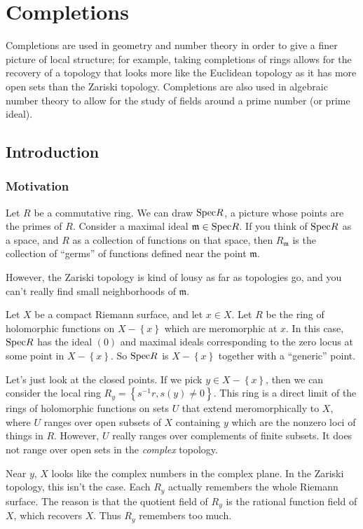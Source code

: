 \chapter{Completions}

Completions are used in geometry and number theory in order to give a finer
picture of local structure; for example, taking completions of rings allows for
the recovery of a topology that looks more like the Euclidean topology as it
has more open sets than the Zariski topology. Completions are also used in
algebraic number theory to allow for the study of fields around a prime number
(or prime ideal).

\section{Introduction}

\subsection{Motivation}
Let $R$ be a commutative ring. We can draw $\mathrm{Spec} R$, a picture whose
points are the primes of $R$. Consider a maximal ideal $\mathfrak{m} \in \mathrm{Spec}
R$. If you think of $\mathrm{Spec} R$ as a space, and $R$ as a collection of functions
on that space, then $R_{\mathfrak{m}}$ is the collection of ``germs'' of
functions defined near the point $\mathfrak{m}$. 

However, the Zariski topology is kind of lousy as far as topologies go, and you can't
really find small neighborhoods of $\mathfrak{m}$.

\begin{example} 
Let $X$ be a compact Riemann surface, and let $x \in X$. Let $R$ be the ring of
holomorphic functions on $X - \left\{x\right\}$ which are meromorphic at $x$.
In this case, $\mathrm{Spec} R$ has the ideal $(0)$ and maximal ideals corresponding to
the zero locus at some point in $X - \left\{x\right\}$. So $\mathrm{Spec} R$ is $X -
\left\{x\right\}$ together with a ``generic'' point.

Let's just look at the closed points.  If we pick $y \in X - \left\{x\right\}$,
then we can consider the local ring $R_y = \left\{s^{-1}r, s(y) \neq
0\right\}$. This ring is a direct limit of the rings of holomorphic functions
on sets $U$ that extend meromorphically to $X$, where $U$ ranges over open
subsets of $X$ containing $y$ which are the nonzero loci of things in $R$. However, $U$ really ranges over complements of
finite subsets. It does not range over open sets in the \emph{complex} topology.

Near $y$, $X$ looks like the complex numbers in the complex plane. In the Zariski topology, this
isn't the case. Each $R_y$ actually remembers the whole Riemann surface. The
reason is that the quotient field of $R_y$ is the rational function field of
$X$, which recovers $X$. Thus $R_y$ remembers too much. 
\end{example} 

